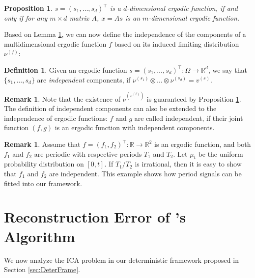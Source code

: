 \documentclass[twoside]{article}
\newcommand{\scom}[1]{s_{#1}}
\newcommand{\real}{\mathbb{R}}
\newtheorem{prop}[lemma]{Proposition}
\theoremstyle{definition}
\newtheorem{definition}[lemma]{Definition}
\newtheorem{remark}[lemma]{Remark}
\begin{document}
\begin{prop}\label{prop:comp}
$s = (\scom{1},\ldots,\scom{d})^{\top}$ is a $d$-dimensional ergodic function, if and only if 
 for any $m\times d$ matrix $A$, $x = A s$ is an $m$-dimensional ergodic function.
\end{prop}  
Based on Lemma \ref{prop:comp}, we can now define the independence of the components of a multidimensional ergodic function $f$ based on its induced limiting distribution $\nu^{(f)}$:
\begin{definition}
Given an ergodic function $s = (\scom{1},\ldots, \scom{d})^{\top}:\Omega \rightarrow \real^d$, 
we say that $\{\scom{1},\ldots, \scom{d}\}$ are \emph{independent} components, 
	if $\nu^{(\scom{1})}\otimes\ldots\otimes\nu^{(\scom{d})} = v^{(s)}$.
\end{definition}
\begin{remark}
Note that the existence of $\nu^{(s^{(i)})}$ is guaranteed by Proposition \ref{prop:comp}. 
The definition of independent components can also be extended to the independence of ergodic functions: 
$f$ and $g$ are called independent, if their joint function $(f,g)$ is an ergodic function with independent components. 
\end{remark}
\begin{remark}
Assume that $f = (f_1,f_2)^{\top}:\real\rightarrow\real^2$ is an ergodic function, and both $f_1$ and $f_2$ are periodic with respective periods $T_1$ and $T_2$. 
Let $\mu_t$ be the uniform probability distribution on $[0,t]$. 
 If $T_1/T_2$ is irrational, then it is easy to show that $f_1$ and $f_2$ are independent. 
 This example shows how period signals can be fitted into our framework.
\end{remark}
\fi

\section{Reconstruction Error of \citet{hsu2013learning}'s Algorithm}
\label{sec:Results}

We now analyze the ICA problem in our deterministic framework proposed in Section \ref{sec:DeterFrame}.
\end{document}

